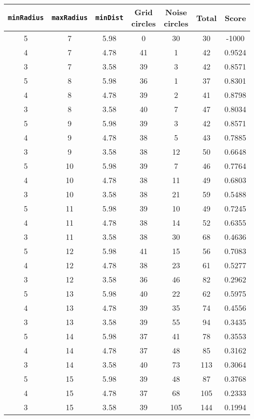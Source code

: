 \documentclass[letterpaper, 12pt]{article}
\begin{document}
\begin{longtable}{|c|c|c|c|c|c|c|}
\hline
\textbf{\texttt{minRadius}} & \textbf{\texttt{maxRadius}} & \textbf{\texttt{minDist}} & \textbf{Grid circles} & \textbf{Noise circles} & \textbf{Total} & \textbf{Score} \\
\hline
5 & 7 & 5.98 & 0 & 30 & 30 & -1000 \\
\hline
4 & 7 & 4.78 & 41 & 1 & 42 & 0.9524 \\
\hline
3 & 7 & 3.58 & 39 & 3 & 42 & 0.8571 \\
\hline
5 & 8 & 5.98 & 36 & 1 & 37 & 0.8301 \\
\hline
4 & 8 & 4.78 & 39 & 2 & 41 & 0.8798 \\
\hline
3 & 8 & 3.58 & 40 & 7 & 47 & 0.8034 \\
\hline
5 & 9 & 5.98 & 39 & 3 & 42 & 0.8571 \\
\hline
4 & 9 & 4.78 & 38 & 5 & 43 & 0.7885 \\
\hline
3 & 9 & 3.58 & 38 & 12 & 50 & 0.6648 \\
\hline
5 & 10 & 5.98 & 39 & 7 & 46 & 0.7764 \\
\hline
4 & 10 & 4.78 & 38 & 11 & 49 & 0.6803 \\
\hline
3 & 10 & 3.58 & 38 & 21 & 59 & 0.5488 \\
\hline
5 & 11 & 5.98 & 39 & 10 & 49 & 0.7245 \\
\hline
4 & 11 & 4.78 & 38 & 14 & 52 & 0.6355 \\
\hline
3 & 11 & 3.58 & 38 & 30 & 68 & 0.4636 \\
\hline
5 & 12 & 5.98 & 41 & 15 & 56 & 0.7083 \\
\hline
4 & 12 & 4.78 & 38 & 23 & 61 & 0.5277 \\
\hline
3 & 12 & 3.58 & 36 & 46 & 82 & 0.2962 \\
\hline
5 & 13 & 5.98 & 40 & 22 & 62 & 0.5975 \\
\hline
4 & 13 & 4.78 & 39 & 35 & 74 & 0.4556 \\
\hline
3 & 13 & 3.58 & 39 & 55 & 94 & 0.3435 \\
\hline
5 & 14 & 5.98 & 37 & 41 & 78 & 0.3553 \\
\hline
4 & 14 & 4.78 & 37 & 48 & 85 & 0.3162 \\
\hline
3 & 14 & 3.58 & 40 & 73 & 113 & 0.3064 \\
\hline
5 & 15 & 5.98 & 39 & 48 & 87 & 0.3768 \\
\hline
4 & 15 & 4.78 & 37 & 68 & 105 & 0.2333 \\
\hline
3 & 15 & 3.58 & 39 & 105 & 144 & 0.1994 \\

\end{longtable}
\end{document}

